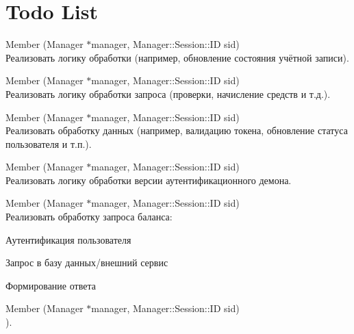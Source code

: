 \chapter{Todo List}
\hypertarget{todo}{}\label{todo}

\begin{DoxyRefList}
\item[Member \doxylink{class_g_n_e_t_1_1_accounting_response_a58529a5d6f2697a88f5c3211571d705b}{GNET\+::Accounting\+Response\+::Process} (Manager \texorpdfstring{$\ast$}{*}manager, Manager\+::\+Session\+::\+ID sid)]\hfill \\
\label{todo__todo000002}%
%
Реализовать логику обработки (например, обновление состояния учётной записи).  
\item[Member \doxylink{class_g_n_e_t_1_1_add_cash_ad20cf7684a67d064a559e96a79ae5675}{GNET\+::Add\+Cash\+::Process} (Manager \texorpdfstring{$\ast$}{*}manager, Manager\+::\+Session\+::\+ID sid)]\hfill \\
\label{todo__todo000004}%
%
Реализовать логику обработки запроса (проверки, начисление средств и т.\+д.).  
\item[Member \doxylink{class_g_n_e_t_1_1_a_u2_game_a1a973d7ce830a0141f60f202a5c0809f}{GNET\+::AU2\+Game\+::Process} (Manager \texorpdfstring{$\ast$}{*}manager, Manager\+::\+Session\+::\+ID sid)]\hfill \\
\label{todo__todo000006}%
%
Реализовать обработку данных (например, валидацию токена, обновление статуса пользователя и т.\+п.).  
\item[Member \doxylink{class_g_n_e_t_1_1_authd_version_a005c37c0e0449e61837bd0a80d3c5f83}{GNET\+::Authd\+Version\+::Process} (Manager \texorpdfstring{$\ast$}{*}manager, Manager\+::\+Session\+::\+ID sid)]\hfill \\
\label{todo__todo000007}%
%
Реализовать логику обработки версии аутентификационного демона.  
\item[Member \doxylink{class_g_n_e_t_1_1_billing_balance_s_a_a6ffab641422705d824ce73926786e682}{GNET\+::Billing\+Balance\+SA\+::Process} (Manager \texorpdfstring{$\ast$}{*}manager, Manager\+::\+Session\+::\+ID sid)]\hfill \\
\label{todo__todo000009}%
%
Реализовать обработку запроса баланса\+:
\begin{DoxyItemize}
\item Аутентификация пользователя
\item Запрос в базу данных/внешний сервис
\item Формирование ответа 
\end{DoxyItemize}
\item[Member \doxylink{class_g_n_e_t_1_1_billing_request_afc7983c052f595d356f4b9ae460cab1b}{GNET\+::Billing\+Request\+::Process} (Manager \texorpdfstring{$\ast$}{*}manager, Manager\+::\+Session\+::\+ID sid)]\hfill \\
\label{todo__todo000011}%
%
).


\end{DoxyRefList}
